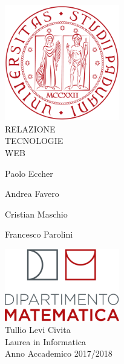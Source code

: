 \documentclass[10pt, a4paper]{article}
\newcommand{\bigsize}{\fontsize{35pt}{20pt}\selectfont}
\newcommand{\mediumsize}{\fontsize{30pt}{20pt}\selectfont}
\newcommand{\normsize}{\fontsize{15pt}{10pt}\selectfont}
\theoremstyle{definition} 	%
\begin{document}
\begin{titlepage}
\centering

\includegraphics[width=50mm]{Images/logo.png}
\vspace*{50px}
{\bigsize \\RELAZIONE\\}
\vspace*{5px}
{\bigsize TECNOLOGIE \\}
\vspace*{5px}
{\bigsize WEB\\}
\vspace*{40px}

{\mediumsize Paolo Eccher\\}
\vspace*{5px}

{\mediumsize Andrea Favero\\}
\vspace*{5px}

{\mediumsize Cristian Maschio\\}
\vspace*{5px}

{\mediumsize Francesco Parolini\\}
\vspace*{40px}

\includegraphics[width=50mm]{Images/dip_mat.png}\\
\vspace*{2.5px}
{\normsize Tullio Levi Civita\\}
\vspace*{\fill} %
{\normsize Laurea in Informatica\\ }
{\normsize Anno Accademico 2017/2018\\ }


\end{titlepage}
\tableofcontents
\end{document}
